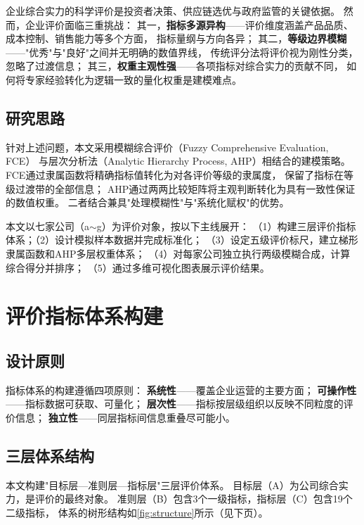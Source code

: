 \documentclass[a4paper,12pt]{ctexart}
\begin{document}
企业综合实力的科学评价是投资者决策、供应链选优与政府监管的关键依据。
然而，企业评价面临三重挑战：
其一，\textbf{指标多源异构}——评价维度涵盖产品品质、成本控制、销售能力等多个方面，
指标量纲与方向各异；
其二，\textbf{等级边界模糊}——"优秀"与"良好"之间并无明确的数值界线，
传统评分法将评价视为刚性分类，忽略了过渡信息；
其三，\textbf{权重主观性强}——各项指标对综合实力的贡献不同，
如何将专家经验转化为逻辑一致的量化权重是建模难点。

\subsection{研究思路}

针对上述问题，本文采用模糊综合评价（Fuzzy Comprehensive Evaluation, FCE）
与层次分析法（Analytic Hierarchy Process, AHP）相结合的建模策略。
FCE通过隶属函数将精确指标值转化为对各评价等级的隶属度，
保留了指标在等级过渡带的全部信息\cite{wang1983}；
AHP通过两两比较矩阵将主观判断转化为具有一致性保证的数值权重\cite{saaty1980}。
二者结合兼具"处理模糊性"与"系统化赋权"的优势。

本文以七家公司（a$\sim$g）为评价对象，按以下主线展开：
（1）构建三层评价指标体系；（2）设计模拟样本数据并完成标准化；
（3）设定五级评价标尺，建立梯形隶属函数和AHP多层权重体系；
（4）对每家公司独立执行两级模糊合成，计算综合得分并排序；
（5）通过多维可视化图表展示评价结果。

\section{评价指标体系构建}

\subsection{设计原则}

指标体系的构建遵循四项原则：
\textbf{系统性}——覆盖企业运营的主要方面；
\textbf{可操作性}——指标数据可获取、可量化；
\textbf{层次性}——指标按层级组织以反映不同粒度的评价信息；
\textbf{独立性}——同层指标间信息重叠尽可能小。

\subsection{三层体系结构}

本文构建"目标层—准则层—指标层"三层评价体系。
目标层（A）为公司综合实力，是评价的最终对象。
准则层（B）包含3个一级指标，指标层（C）包含19个二级指标，
体系的树形结构如\cref{fig:structure}所示（见下页）。
\end{document}

